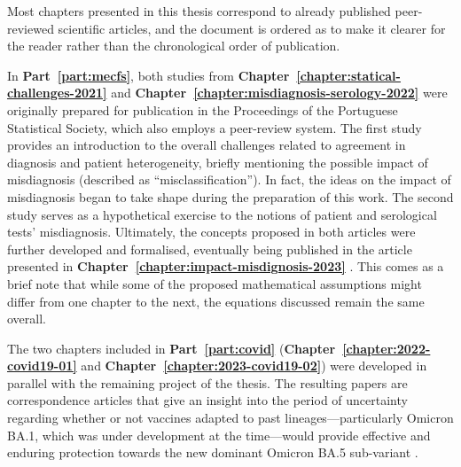 
Most chapters presented in this thesis correspond to already published peer-reviewed scientific articles, and the document is ordered as to make it clearer for the reader rather than the chronological order of publication.

In \textbf{Part~\ref{part:mecfs}}, both studies from \textbf{Chapter~\ref{chapter:statical-challenges-2021}} \citep{malato2021Statisticalchallenges} and \textbf{Chapter~\ref{chapter:misdiagnosis-serology-2022}} \citep{malato2022ImpactMisclassification} were originally prepared for publication in the Proceedings of the Portuguese Statistical Society, which also employs a peer-review system.
The first study provides an introduction to the overall challenges related to agreement in \cfs diagnosis and patient heterogeneity, briefly mentioning the possible impact of misdiagnosis (described as ``misclassification'').
In fact, the ideas on the impact of misdiagnosis began to take shape during the preparation of this work.
The second study serves as a hypothetical exercise to the notions of patient and serological tests' misdiagnosis.
Ultimately, the concepts proposed in both articles were further developed and formalised, eventually being published in the article presented in \textbf{Chapter~\ref{chapter:impact-misdignosis-2023}} \citep{malato2023ImpactMisdiagnosis}.
This comes as a brief note that while some of the proposed mathematical assumptions might differ from one chapter to the next, the equations discussed remain the same overall.

The two chapters included in \textbf{Part~\ref{part:covid}} (\textbf{Chapter~\ref{chapter:2022-covid19-01}} and \textbf{Chapter~\ref{chapter:2023-covid19-02}}) were developed in parallel with the remaining project of the thesis.
The resulting papers are correspondence articles that give an insight into the period of uncertainty regarding whether or not vaccines adapted to past lineages---particularly Omicron BA.1, which was under development at the time---would provide effective and enduring protection towards the new dominant Omicron BA.5 sub-variant \citep{malatoRiskBAInfection2022, malato2023StabilityHybrida}.


